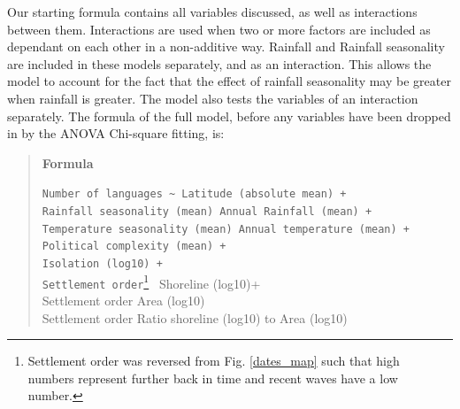 \documentclass[a4paper,10pt]{article} %
\begin{document}

Our starting formula contains all variables discussed, as well as interactions between them. Interactions are used when two or more factors are included as dependant on each other in a non-additive way. Rainfall and Rainfall seasonality are included in these models separately, and as an interaction. This allows the model to account for the fact that the effect of rainfall seasonality may be greater when rainfall is greater. The model also tests the variables of an interaction separately. The formula of the full model, before any variables have been dropped in by the ANOVA Chi-square fitting, is:


\begin{quotation}
\textbf{Formula} 

\texttt{Number of languages \textasciitilde{} Latitude (absolute mean) + \\
Rainfall seasonality (mean) \textasteriskcentered{}   Annual Rainfall (mean) + \\
Temperature seasonality (mean) \textasteriskcentered{}   Annual temperature (mean)  + \\
Political complexity (mean) + \\
Isolation (log10) + \\ 
Settlement order}\footnote{Settlement order was reversed from Fig. \ref{dates_map} such that high \\ numbers represent further back in time and recent waves have a low number.}\texttt{\textasteriskcentered{} }  Shoreline (log10)+ \\
Settlement order \textasteriskcentered{}   Area (log10) \\ 
Settlement order \textasteriskcentered{}  Ratio shoreline (log10) to Area (log10) \\
\end{quotation}
\end{document}
